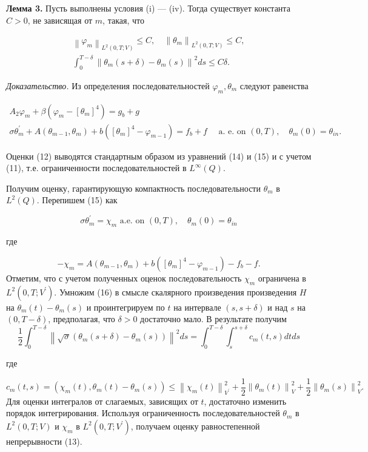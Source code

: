 \textbf{Лемма 3.} Пусть выполнены условия (i) — (iv). Тогда существует константа $C>0$, не зависящая от $m$, такая, что

$$
\begin{gathered}
    \left\|\varphi_{m}\right\|_{L^{2}(0, T ; V)} \leq C, \quad\left\|\theta_{m}\right\|_{L^{2}(0, T ; V)} \leq C, \\
    \int_{0}^{T-\delta}\left\|\theta_{m}(s+\delta)-\theta_{m}(s)\right\|^{2} d s \leq C \delta .
\end{gathered}
$$

\textit{Доказательство.}
Из определения последовательностей $\varphi_{m}, \theta_{m}$ следуют равенства

$$
\begin{gathered}
    A_{2} \varphi_{m}+\beta\left(\varphi_{m}-\left[\theta_{m}\right]^{4}\right)=g_{b}+g \\
    \sigma \theta_{m}^{\prime}+A\left(\theta_{m-1},
    \theta_{m}\right)+b\left(\left[\theta_{m}\right]^{4}-\varphi_{m-1}\right)=f_{b}+f
    \quad \text { a. e. on }(0, T), \quad \theta_{m}(0)=\theta_{i n}.
\end{gathered}
$$

Оценки (12) выводятся стандартным образом из уравнений (14) и (15) и с учетом (11),
т.е. ограниченности последовательностей в $L^{\infty}(Q)$.

Получим оценку, гарантирующую компактность последовательности $\theta_{m}$ в $L^{2}(Q)$.
Перепишем (15) как

$$
\sigma \theta_{m}^{\prime}=\chi_{m} \text { a.e. on }(0, T), \quad \theta_{m}(0)=\theta_{i n}
$$

где

$$
-\chi_{m}=A\left(\theta_{m-1}, \theta_{m}\right)+b\left(\left[\theta_{m}\right]^{4}-\varphi_{m-1}\right)-f_{b}-f .
$$
Отметим, что с учетом полученных оценок последовательность
$\chi_{m}$ ограничена в $L^{2}\left(0, T ; V^{\prime}\right)$.
Умножим (16) в смысле скалярного произведения произведения $H$ на $\theta_{m}(t)-\theta_{m}(s)$
и проинтегрируем по $t$ на интервале $(s, s+\delta)$ и
над $s$ на $(0, T-\delta)$, предполагая, что $\delta>0$ достаточно мало.
В результате получим
$$
\frac{1}{2} \int_{0}^{T-\delta}\left\|\sqrt{\sigma}\left(\theta_{m}(s+\delta)
-\theta_{m}(s)\right)\right\|^{2} d s=\int_{0}^{T-\delta} \int_{s}^{s+\delta} c_{m}(t, s) d t d s
$$

где

$$
c_{m}(t, s)=\left(\chi_{m}(t), \theta_{m}(t)-\theta_{m}(s)\right) \leq\left\|\chi_{m}(t)\right\|_{V^{\prime}}^{2}
+\frac{1}{2}\left\|\theta_{m}(t)\right\|_{V}^{2}+\frac{1}{2}\left\|\theta_{m}(s)\right\|_{V}^{2} .
$$
Для оценки интегралов от слагаемых, зависящих от $t$, достаточно изменить порядок интегрирования.
Используя ограниченность последовательностей
$\theta_{m}$ в $L^{2}(0, T ; V)$ и $\chi_{m}$ в $L^{2}\left(0, T ; V^{\prime}\right)$,
получаем оценку равностепенной непрерывности (13).

